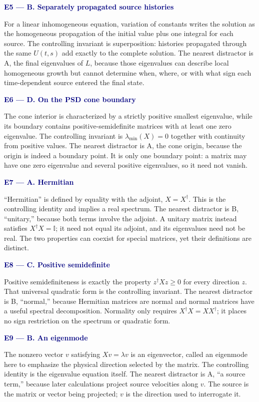 \documentclass[10pt]{article}
\newcommand{\I}{\mathbb I}
\newcommand{\qhead}[2]{%
  \needspace{8\baselineskip}
  \par\medskip\noindent\textcolor{navy}{\textbf{#1. #2}}\par
}
\begin{document}
\qhead{E5 --- B}{Separately propagated source histories}

For a linear inhomogeneous equation, variation of constants writes the
solution as the homogeneous propagation of the initial value plus one
integral for each source.  The controlling invariant is superposition:
histories propagated through the same \(U(t,s)\) add exactly to the complete
solution.  The nearest distractor is A, the final eigenvalues of \(L\), because
those eigenvalues can describe local homogeneous growth but cannot determine
when, where, or with what sign each time-dependent source entered the final
state.

\qhead{E6 --- D}{On the PSD cone boundary}

The cone interior is characterized by a strictly positive smallest
eigenvalue, while its boundary contains positive-semidefinite matrices with at
least one zero eigenvalue.  The controlling invariant is
\(\lambda_{\min}(X)=0\) together with continuity from positive values.  The
nearest distractor is A, the cone origin, because the origin is indeed a
boundary point.  It is only one boundary point: a matrix may have one zero
eigenvalue and several positive eigenvalues, so it need not vanish.

\qhead{E7 --- A}{Hermitian}

``Hermitian'' is defined by equality with the adjoint,
\(X=X^\dagger\).  This is the controlling identity and implies a real
spectrum.  The nearest distractor is B, ``unitary,'' because both terms
involve the adjoint.  A unitary matrix instead satisfies
\(X^\dagger X=\I\); it need not equal its adjoint, and its eigenvalues need
not be real.  The two properties can coexist for special matrices, yet their
definitions are distinct.

\qhead{E8 --- C}{Positive semidefinite}

Positive semidefiniteness is exactly the property
\(z^\dagger Xz\geq0\) for every direction \(z\).  That universal quadratic
form is the controlling invariant.  The nearest distractor is B, ``normal,''
because Hermitian matrices are normal and normal matrices have a useful
spectral decomposition.  Normality only requires
\(X^\dagger X=XX^\dagger\); it places no sign restriction on the spectrum or
quadratic form.

\qhead{E9 --- B}{An eigenmode}

The nonzero vector \(v\) satisfying \(Xv=\lambda v\) is an eigenvector, called
an eigenmode here to emphasize the physical direction selected by the
matrix.  The controlling identity is the eigenvalue equation itself.  The
nearest distractor is A, ``a source term,'' because later calculations
project source velocities along \(v\).  The source is the matrix or vector
being projected; \(v\) is the direction used to interrogate it.
\end{document}
